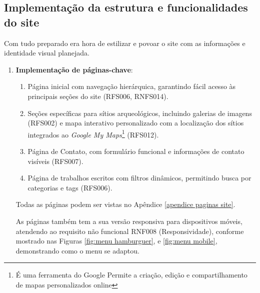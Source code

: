     \subsection{Implementação da estrutura e funcionalidades do site}
    Com tudo preparado era hora de estilizar e povoar o site com as informações e identidade visual planejada.
    \begin{enumerate}
        \item \textbf{Implementação de páginas-chave}:
        \begin{enumerate}
            \item Página inicial com navegação hierárquica, garantindo fácil acesso às principais seções do site (RFS006, RNFS014).
            \item Seções específicas para sítios arqueológicos, incluindo galerias de imagens (RFS002) e mapa interativo personalizado com a localização dos sítios integrados ao \textit{Google My Maps}\footnote{É uma ferramenta do Google Permite a criação, edição e compartilhamento de mapas personalizados online} (RFS012).
            \item Página de Contato, com formulário funcional e informações de contato visíveis (RFS007).
            \item Página de trabalhos escritos com filtros dinâmicos, permitindo busca por categorias e tags (RFS006).
            \end{enumerate}
            Todas as páginas podem ser vistas no Apêndice \ref{apendice paginas site}.

            As páginas também tem a sua versão responsiva para dispositivos móveis, atendendo ao requisito não funcional RNF008 (Responsividade), conforme mostrado nas Figuras \ref{fig:menu hamburguer}, e \ref{fig:menu mobile}, demonstrando como o menu se adaptou. 


\end{enumerate}
